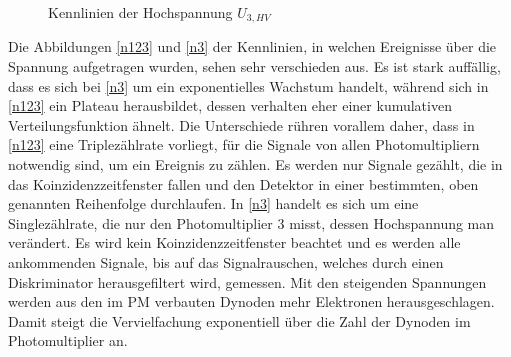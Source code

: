             \begin{figure}[htbp]
                \caption{Kennlinien der Hochspannung $U_{3,HV}$}
            \end{figure}
            Die Abbildungen \ref{n123} und \ref{n3} der Kennlinien, in welchen Ereignisse über die Spannung aufgetragen wurden, sehen sehr verschieden aus. Es ist stark auffällig, dass es sich bei \ref{n3} um ein exponentielles Wachstum handelt, während sich in \ref{n123} ein Plateau herausbildet, dessen verhalten eher einer kumulativen Verteilungsfunktion ähnelt. 
            Die Unterschiede rühren vorallem daher, dass in \ref{n123} eine Triplezählrate  \cite{PA} vorliegt, für die Signale von allen Photomultipliern notwendig sind, um ein Ereignis zu zählen. Es werden nur Signale gezählt, die in das Koinzidenzzeitfenster fallen und den Detektor in einer bestimmten, oben genannten Reihenfolge durchlaufen. In \ref{n3} handelt es sich um eine Singlezählrate, die nur den Photomultiplier 3 misst, dessen Hochspannung man verändert. Es wird kein Koinzidenzzeitfenster beachtet und es werden alle ankommenden Signale, bis auf das Signalrauschen, welches durch einen Diskriminator herausgefiltert wird, gemessen. Mit den steigenden Spannungen werden aus den im PM verbauten Dynoden mehr Elektronen herausgeschlagen. Damit steigt die Vervielfachung exponentiell über die Zahl der Dynoden im Photomultiplier an.\\
